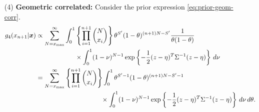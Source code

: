 {{\begin{enumerate}
        Let $B_N = B(\alpha_1+1,N+\beta_1)$ to reduce the size of the
        expression. Then
        \begin{equation*}
            \begin{split}
                g_3(x_{n+1}|\bx) &\propto \sum_{N=x_{\max}}^{\infty} \int_0^1 \left\{\prod_{i=1}^{n+1}\binom{N}{x_i}\right\}\theta^{S'}(1-\theta)^{(n+1)N-S'}B_N\theta^{\alpha_2-1}(1-\theta)^{\beta_2-1} \,d\theta \\
                &= \sum_{N=x_{\max}}^{\infty} \left\{\prod_{i=1}^{n+1}\binom{N}{x_i}\right\}  B_N \int_0^1 \theta^{S'+\alpha_2-1}(1-\theta)^{(n+1)N+\beta_2-S'-1} \, d\theta \\
                &= \sum_{N=x_{\max}}^{\infty} \left\{\prod_{i=1}^{n+1}\binom{N}{x_i}\right\} B(\alpha_1 + 1, N + \beta_1) B(S' + \alpha_2, (n+1)N + \beta_2 - S'). 
            \end{split}
        \end{equation*} 

        \item[(4)] {\bf Geometric correlated:} Consider the prior expression \ref{eq:prior-geom-corr}.
        \begin{equation*}
            \begin{split}
                g_4(x_{n+1}|\boldsymbol{x}) &\propto \sum_{N=x_{\max}}^{\infty} \int_0^1 \left\{\prod_{i=1}^{n+1}\binom{N}{x_i}\right\}\theta^{S'}(1-\theta)^{(n+1)N-S'} \frac{1}{\theta(1-\theta)} \\ 
                & \qquad\qquad\qquad \times \int_0^1 (1-\nu)^{N-1}\exp\left\{-\frac{1}{2}(z - \eta)^T\Sigma^{-1}(z-\eta)\right\} \, d\nu \\
                &= \sum_{N=x_{\max}}^{\infty} \left\{\prod_{i=1}^{n+1}\binom{N}{x_i}\right\} \int_0^1 \theta^{S'-1}(1-\theta)^{(n+1)N-S'-1} \\   
                & \qquad\qquad\qquad\qquad\qquad \times \int_0^1 (1-\nu)^{N-1}\exp\left\{-\frac{1}{2}(z - \eta)^T\Sigma^{-1}(z-\eta)\right\} \, d\nu \, d\theta. \\
            \end{split}
        \end{equation*} 
    \end{enumerate}
}}


\vspace{2ex}